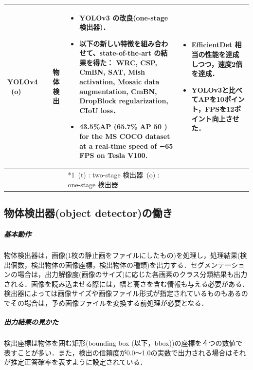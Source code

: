 \documentclass[twocolumn]{jsarticle} %
\begin{document}
\begin{table}
\begin{center}
\begin{tabularx}{\linewidth}{Xp{1.5cm}Xp{7cm}X}
            YOLOv4 \ (o) & \cite{BWL20} & 物体検出 & 
            \begin{itemize}
                \vspace{-0.7\baselineskip}
                \setlength{\leftskip}{-3mm}
                \item YOLOv3 の改良(one-stage 検出器)．
                \item 以下の新しい特徴を組み合わせて、state-of-the-art の結果を得た： WRC, CSP, CmBN, SAT, Mish activation, Mosaic data augmentation, CmBN, DropBlock regularization, CIoU loss．
                \item 43.5\%AP (65.7\% AP 50 ) for the MS COCO dataset at a real-time speed of ∼65 FPS on Tesla V100.
            \end{itemize}
            &
            \begin{itemize}
                \vspace{-0.7\baselineskip}
                \setlength{\leftskip}{-3mm}
                \item EfficientDet 相当の性能を達成しつつ，速度2倍を達成．
                \item YOLOv3と比べてAPを10ポイント，FPSを12ポイント向上させた．
            \end{itemize}
            \\
            \bottomrule
             &  &  & *1\ (t) : two-stage 検出器\quad *2\ (o) : one-stage 検出器 &  \\
        \end{tabularx}
    \end{center}
\end{table}%

\subsection{物体検出器(object detector)の働き}
\subparagraph{基本動作}物体検出器は，画像(1枚の静止画をファイルにしたもの)を処理し，処理結果(検出個数，検出物体の画像座標，検出物体の種類)を出力する．セグメンテーションの場合は，出力解像度(画像のサイズ)に応じた各画素のクラス分類結果も出力される．画像を読み込ませる際には，幅と高さを含む情報も与える必要がある．検出器によっては画像サイズや画像ファイル形式が指定されているものもあるのでその場合は，予め画像ファイルを変換する前処理が必要となる．

\subparagraph{出力結果の見かた}検出座標は物体を囲む矩形(bounding box (以下，bbox))の座標を４つの数値で表すことが多い．また，検出の信頼度が0.0〜1.0の実数で出力される場合はそれが推定正答確率を表すように設定されている．
\end{document}
